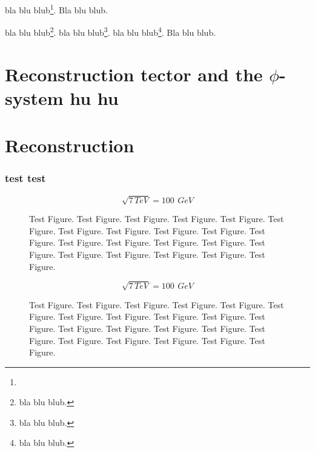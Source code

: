 \lipsum[1]bla blu blub\footnote{\lipsum[1]}. Bla blu blub.\lipsum[1]

\lipsum[2]

\lipsum[1]bla blu blub\footnote{bla blu blub.}. bla blu blub\footnote{bla blu blub.}. bla blu blub\footnote{bla blu blub.}. Bla blu blub.\lipsum[1]

\lipsum[2]


\section{Reconstruction tector and the $\phi$-system hu hu}

\lipsum[4]


\section{Reconstruction}

\lipsum[2]


\subsubsection{test test}

\lipsum[1]

\begin{equation}
\sqrt{7\,TeV}=100\,{\ GeV}
\end{equation}


\lipsum[4]

\lipsum[2]
\begin{figure}[th]
\begin{center}
\end{center}

\caption{Test Figure. Test Figure. Test Figure. Test Figure. Test Figure. Test
Figure. Test Figure. Test Figure. Test Figure. Test Figure. Test Figure.
Test Figure. Test Figure. Test Figure. Test Figure. Test Figure. Test
Figure. Test Figure. Test Figure. Test Figure. Test Figure.}
\end{figure}


\lipsum[1]

\begin{equation}
\sqrt{7\,TeV}=100\,{\ GeV}
\end{equation}


\lipsum[4]

\lipsum[2]

\begin{figure}[th]
\begin{center}
\end{center}

\caption{Test Figure. Test Figure. Test Figure. Test Figure. Test Figure. Test
Figure. Test Figure. Test Figure. Test Figure. Test Figure. Test Figure.
Test Figure. Test Figure. Test Figure. Test Figure. Test Figure. Test
Figure. Test Figure. Test Figure. Test Figure. Test Figure.}
\end{figure}


